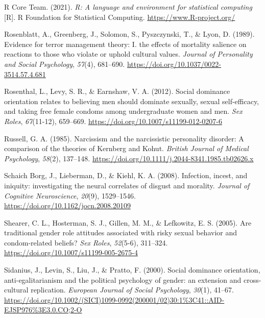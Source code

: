\documentclass[
  donotrepeattitle,doc, 12pt, a4paper,floatsintext]{apa7}
\newlength{\cslhangindent}
\newlength{\cslentryspacingunit} %
\newenvironment{CSLReferences}[2] %
 {%
  \setlength{\parindent}{0pt}
  \ifodd #1
  \let\oldpar\par
  \def\par{\hangindent=\cslhangindent\oldpar}
  \fi
  \setlength{\parskip}{#2\cslentryspacingunit}
 }%
 {}
\begin{document}
\begin{CSLReferences}{1}{0}
\leavevmode{}%
R Core Team. (2021). \emph{R: A language and environment for statistical computing} {[}R{]}. R Foundation for Statistical Computing. \url{https://www.R-project.org/}

\leavevmode{}%
Rosenblatt, A., Greenberg, J., Solomon, S., Pyszczynski, T., \& Lyon, D. (1989). Evidence for terror management theory: I. the effects of mortality salience on reactions to those who violate or uphold cultural values. \emph{Journal of Personality and Social Psychology}, \emph{57}(4), 681--690. \url{https://doi.org/10.1037/0022-3514.57.4.681}

\leavevmode{}%
Rosenthal, L., Levy, S. R., \& Earnshaw, V. A. (2012). Social dominance orientation relates to believing men should dominate sexually, sexual self-efficacy, and taking free female condoms among undergraduate women and men. \emph{Sex Roles}, \emph{67}(11-12), 659--669. \url{https://doi.org/10.1007/s11199-012-0207-6}

\leavevmode{}%
Russell, G. A. (1985). Narcissism and the narcissistic personality disorder: A comparison of the theories of Kernberg and Kohut. \emph{British Journal of Medical Psychology}, \emph{58}(2), 137--148. \url{https://doi.org/10.1111/j.2044-8341.1985.tb02626.x}

\leavevmode{}%
Schaich Borg, J., Lieberman, D., \& Kiehl, K. A. (2008). Infection, incest, and iniquity: investigating the neural correlates of disgust and morality. \emph{Journal of Cognitive Neuroscience}, \emph{20}(9), 1529--1546. \url{https://doi.org/10.1162/jocn.2008.20109}

\leavevmode{}%
Shearer, C. L., Hosterman, S. J., Gillen, M. M., \& Lefkowitz, E. S. (2005). Are traditional gender role attitudes associated with risky sexual behavior and condom-related beliefs? \emph{Sex Roles}, \emph{52}(5-6), 311--324. \url{https://doi.org/10.1007/s11199-005-2675-4}

\leavevmode{}%
Sidanius, J., Levin, S., Liu, J., \& Pratto, F. (2000). Social dominance orientation, anti-egalitarianism and the political psychology of gender: an extension and cross-cultural replication. \emph{European Journal of Social Psychology}, \emph{30}(1), 41--67. \url{https://doi.org/10.1002/(SICI)1099-0992(200001/02)30:1\%3C41::AID-EJSP976\%3E3.0.CO;2-O}


\end{CSLReferences}
\end{document}
